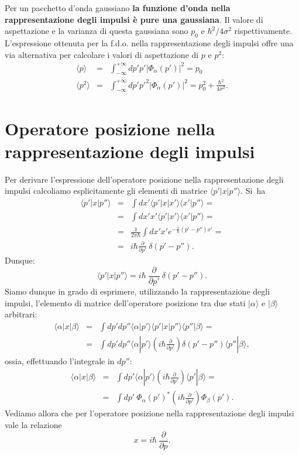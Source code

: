 \documentclass[a4paper,12pt,oneside]{book}
\begin{document}
Per un pacchetto d'onda gaussiano \textbf{la funzione d'onda nella rappresentazione degli impulsi è pure una gaussiana}. Il valore di aspettazione e la varianza di questa gaussiana sono $p_0$ e $\hbar^2/4 \sigma^2$ rispettivamente.\\
L'espressione ottenuta per la f.d.o. nella rappresentazione degli impulsi offre una via alternativa per calcolare i valori di aspettazione di $p$ e $p^2$:
\begin{eqnarray}
\langle p \rangle &=& \int_{-\infty}^{+\infty} dp' p' |\Phi_\alpha(p')|^2 = p_0\\
\langle p^2 \rangle &=& \int_{-\infty}^{+\infty} dp' p'^2 |\Phi_\alpha(p')|^2 = p_0^2 + \frac{\hbar^2}{4 \sigma^2}.
\end{eqnarray}
\section{Operatore posizione nella rappresentazione degli impulsi}
Per derivare l'espressione dell'operatore posizione nella rappresentazione degli impulsi calcoliamo esplicitamente gli elementi di matrice $\langle p' | x | p'' \rangle$. Si~ha
\begin{eqnarray}
\langle p' | x | p'' \rangle &=& \int dx' \langle p' | x | x' \rangle \langle x' | p'' \rangle = \nonumber\\
&=& \int dx' x' \langle p' | x' \rangle \langle x' | p'' \rangle = \nonumber\\
&=& \frac{1}{2 \pi \hbar} \int dx' x' e^{-\frac{i}{\hbar} (p'-p'') x'} = \nonumber \\
&=& i \hbar \frac{\partial}{\partial p'} ~\delta(p' - p'').
\end{eqnarray}
Dunque:
\begin{equation}
\langle p' | x | p'' \rangle = i \hbar~ \frac{\partial}{\partial p'} ~\delta(p' - p'').
\end{equation}
Siamo dunque in grado di esprimere, utilizzando la rappresentazione degli impulsi, l'elemento di matrice dell'operatore posizione tra due stati $| \alpha \rangle$ e $| \beta \rangle$ arbitrari:
\begin{eqnarray}
\langle \alpha | x | \beta \rangle &=& \int dp' dp'' \langle \alpha | p' \rangle \langle p' | x | p'' \rangle \langle p'' | \beta \rangle = \nonumber \\
&=& \int dp' dp'' \langle \alpha | p' \rangle \left(i \hbar \frac{\partial}{\partial p'} \right) \delta(p'-p'') \langle p'' | \beta \rangle,
\end{eqnarray}
ossia, effettuando l'integrale in $dp''$:
\begin{eqnarray}
\langle \alpha | x | \beta \rangle &=& \int dp' \langle \alpha | p' \rangle \left(i \hbar \frac{\partial}{\partial p'} \right) \langle p' | \beta \rangle = \nonumber\\
&=& \int dp'~ \Phi_\alpha(p')^* \left(i \hbar \frac{\partial}{\partial p'} \right) \Phi_\beta(p').
\end{eqnarray}
Vediamo allora che per l'operatore posizione nella rappresentazione degli impulsi vale la relazione
\begin{equation}
x = i \hbar~ \frac{\partial}{\partial p} .
\end{equation}
\end{document}
